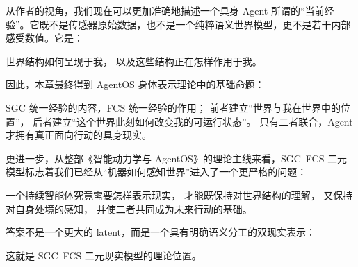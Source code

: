 从作者的视角，我们现在可以更加准确地描述一个具身 Agent 所谓的“当前经验”。它既不是传感器原始数据，也不是一个纯粹语义世界模型，更不是若干内部感受数值。它是：

\begin{statementbox}
世界结构如何呈现于我，
以及这些结构正在怎样作用于我。
\end{statementbox}

因此，本章最终得到 AgentOS 身体表示理论中的基础命题：

\begin{proposition*}
SGC 统一经验的内容，FCS 统一经验的作用；
前者建立“世界与我在世界中的位置”，
后者建立“这个世界此刻如何改变我的可运行状态”。
只有二者联合，Agent 才拥有真正面向行动的具身现实。
\end{proposition*}

更进一步，从整部《智能动力学与 AgentOS》的理论主线来看，SGC--FCS 二元模型标志着我们已经从“机器如何感知世界”进入了一个更严格的问题：

\begin{statementbox}
一个持续智能体究竟需要怎样表示现实，
才能既保持对世界结构的理解，
又保持对自身处境的感知，
并使二者共同成为未来行动的基础。
\end{statementbox}

答案不是一个更大的 latent，而是一个具有明确语义分工的双现实表示：

\begin{statementbox}
\centering
{}
\end{statementbox}

这就是 SGC--FCS 二元现实模型的理论位置。
